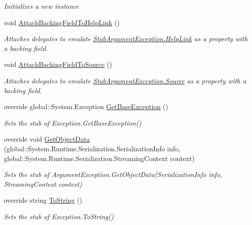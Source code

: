 \begin{DoxyCompactItemize}
\begin{DoxyCompactList}\small\item\em Initializes a new instance\end{DoxyCompactList}\item 
void \hyperlink{class_system_1_1_fakes_1_1_stub_argument_exception_aa9d028dfa0e4747de561c87e8f934bf6}{Attach\-Backing\-Field\-To\-Help\-Link} ()
\begin{DoxyCompactList}\small\item\em Attaches delegates to emulate \hyperlink{class_system_1_1_fakes_1_1_stub_argument_exception_ae588834a0bea95d1d47c2adc41e31115}{Stub\-Argument\-Exception.\-Help\-Link} as a property with a backing field.\end{DoxyCompactList}\item 
void \hyperlink{class_system_1_1_fakes_1_1_stub_argument_exception_a9f32d70879ebadc2cffc346c91657d4d}{Attach\-Backing\-Field\-To\-Source} ()
\begin{DoxyCompactList}\small\item\em Attaches delegates to emulate \hyperlink{class_system_1_1_fakes_1_1_stub_argument_exception_ae79c03360e607d0f871f5ba078dd5a18}{Stub\-Argument\-Exception.\-Source} as a property with a backing field.\end{DoxyCompactList}\item 
override global\-::\-System.\-Exception \hyperlink{class_system_1_1_fakes_1_1_stub_argument_exception_a0d69dac46b3c09593c7ba93409bfad60}{Get\-Base\-Exception} ()
\begin{DoxyCompactList}\small\item\em Sets the stub of Exception.\-Get\-Base\-Exception()\end{DoxyCompactList}\item 
override void \hyperlink{class_system_1_1_fakes_1_1_stub_argument_exception_ad341ff375bc7aa897b9391f3491c426a}{Get\-Object\-Data} (global\-::\-System.\-Runtime.\-Serialization.\-Serialization\-Info info, global\-::\-System.\-Runtime.\-Serialization.\-Streaming\-Context context)
\begin{DoxyCompactList}\small\item\em Sets the stub of Argument\-Exception.\-Get\-Object\-Data(\-Serialization\-Info info, Streaming\-Context context)\end{DoxyCompactList}\item 
override string \hyperlink{class_system_1_1_fakes_1_1_stub_argument_exception_a10850f658c2439d6fd94a31a8521329c}{To\-String} ()
\begin{DoxyCompactList}\small\item\em Sets the stub of Exception.\-To\-String()\end{DoxyCompactList}\end{DoxyCompactItemize}
